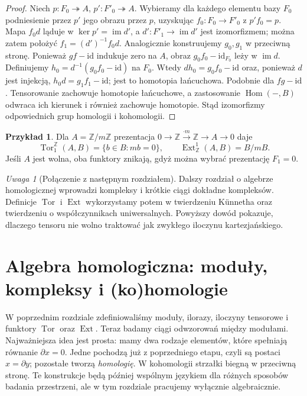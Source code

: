 \documentclass[11pt,a4paper,oneside]{report}
\newcommand{\Z}{\mathbb{Z}}
\newcommand{\id}{\mathrm{id}}
\theoremstyle{plain}
\theoremstyle{definition}
\newtheorem{przyklad}[twierdzenie]{Przykład}
\theoremstyle{remark}
\newtheorem{uwaga}[twierdzenie]{Uwaga}
\begin{document}
\begin{proof}
Niech $p:F_0\twoheadrightarrow A$, $p':F'_0\twoheadrightarrow A$.
Wybieramy dla każdego elementu bazy $F_0$ podniesienie przez
$p'$ jego obrazu przez $p$, uzyskując $f_0:F_0\to F'_0$
z $p'f_0=p$. Mapa $f_0d$ ląduje w $\ker p'=\operatorname{im}d'$, 
a $d':F'_1\to\operatorname{im}d'$ jest izomorfizmem;
można zatem położyć $f_1=(d')^{-1}f_0d$.
Analogicznie konstruujemy $g_0,g_1$ w przeciwną stronę.
Ponieważ $gf-\id$ indukuje zero na $A$, obraz
$g_0f_0-\id_{F_0}$ leży w $\operatorname{im}d$.
Definiujemy $h_0=d^{-1}(g_0f_0-\id)$ na $F_0$.
Wtedy $dh_0=g_0f_0-\id$ oraz, ponieważ $d$ jest injekcją,
$h_0d=g_1f_1-\id$; jest to homotopia łańcuchowa.
Podobnie dla $fg-\id$. Tensorowanie zachowuje homotopie
łańcuchowe, a zastosowanie $\operatorname{Hom}(-,B)$
odwraca ich kierunek i również zachowuje homotopie.
Stąd izomorfizmy odpowiednich grup homologii i kohomologii.
\end{proof}
\begin{przyklad}
Dla $A=\Z/m\Z$ prezentacja
$0\to\Z\xrightarrow{\cdot m}\Z\to A\to0$ daje
\[
\operatorname{Tor}_1^\Z(A,B)=\{b\in B:mb=0\},\qquad
\operatorname{Ext}^1_\Z(A,B)=B/mB.
\]
Jeśli $A$ jest wolna, oba funktory znikają, gdyż można
wybrać prezentację $F_1=0$.
\end{przyklad}
\begin{uwaga}[Połączenie z następnym rozdziałem]
Dalszy rozdział o algebrze homologicznej wprowadzi
kompleksy i krótkie ciągi dokładne kompleksów. Definicje
$\operatorname{Tor}$ i $\operatorname{Ext}$ wykorzystamy potem
w twierdzeniu Künnetha oraz twierdzeniu o współczynnikach
uniwersalnych. Powyższy dowód pokazuje, dlaczego tensoru
nie wolno traktować jak zwykłego iloczynu kartezjańskiego.
\end{uwaga}
\clearpage


\chapter{Algebra homologiczna: moduły, kompleksy i (ko)homologie}
\label{ch:algebra-homologiczna}

W poprzednim rozdziale zdefiniowaliśmy moduły, ilorazy,
iloczyny tensorowe i funktory $\operatorname{Tor}$ oraz $\operatorname{Ext}$.
Teraz badamy ciągi odwzorowań między modułami. Najważniejsza idea
jest prosta: mamy dwa rodzaje elementów, które spełniają
równanie $\partial x=0$. Jedne pochodzą już z poprzedniego
etapu, czyli są postaci $x=\partial y$; pozostałe tworzą
\emph{homologię}. W kohomologii strzałki biegną w
przeciwną stronę. Te konstrukcje będą później wspólnym
językiem dla różnych sposobów badania przestrzeni,
ale w tym rozdziale pracujemy wyłącznie algebraicznie.
\end{document}
